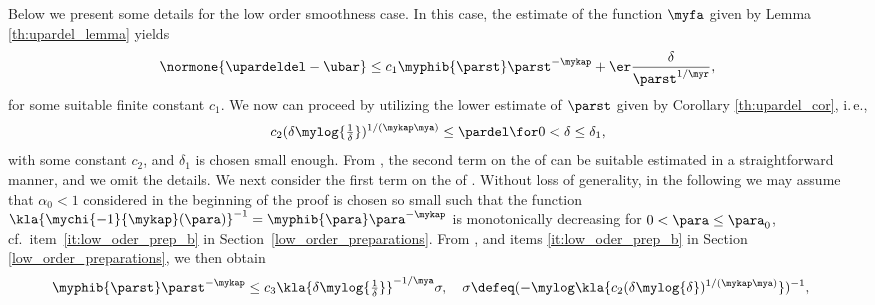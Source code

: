 \documentclass[10pt]{article}
\theoremstyle{definition}
\begin{document}
Below we present some details for the low order smoothness case.
In this case, the estimate of
the function $ \myfa $ given by Lemma \ref{th:upardel_lemma}
yields
%
\begin{align}
\normone{\upardeldel-\ubar}
\le c_1 \myphib{\parst}\parst^{-\mykap } + \er \frac{\delta}{\parst^{1/\myr}},
\label{eq:upardel_cor_b2}
\end{align}
%
for some suitable finite constant $ c_1 $.
We now  can proceed
by utilizing the lower estimate of $ \parst $
given by Corollary \ref{th:upardel_cor}, i.\,e.,
%
\begin{align}
c_2 ( \delta \mylog{\tfrac{1}{\delta}})^{1/(\mykap\mya)}
\le \pardel
\for 0 < \delta \le \delta_1,
\label{eq:upardel_cor_b3}
\end{align}
%
with some constant $ c_2 $, and $ \delta_1 $ is chosen small enough.
From , the second term on the \rhs of  can be suitable estimated in a straightforward manner, and we omit the details.
%
%
We next consider the first term on the \rhs of .
Without loss of generality, in the following we may assume that $ \alpha_0 < 1 $ considered in the beginning of the proof is chosen so small such that
the function
$ \kla{\mychi{-1}{\mykap}(\para)}^{-1} =
\myphib{\para}\para^{-\mykap } $
is monotonically decreasing for $ 0 < \para \le \para_0 $, cf.~item~\ref{it:low_oder_prep_b} in Section~\ref{low_order_preparations}.
From ,  and items \ref{it:low_oder_prep_b} in Section \ref{low_order_preparations}, we then obtain
%
%
\begin{align*}
& \myphib{\parst}\parst^{-\mykap } \le
c_3 \kla{\delta \mylog{\tfrac{1}{\delta}}}^{-1/\mya} \sigma,
\quad
\sigma \defeq
(-\mylog\kla{{c_2 ( \delta \mylog{\delta})^{1/(\mykap\mya)}}})^{-1},
%
\end{align*}
\end{document}
